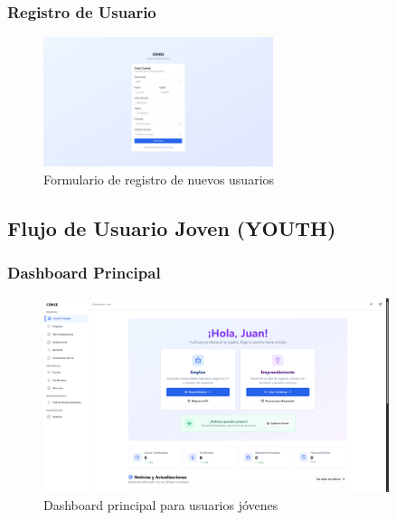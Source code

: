 \documentclass[12pt,a4paper]{article}
\begin{document}
\begin{enumerate}
\subsubsection{Registro de Usuario}
\begin{figure}[H]
    \centering
    \includegraphics[width=0.6\textwidth]{screenshots/auth/sign-up.png}
    \caption{Formulario de registro de nuevos usuarios}
    \label{fig:sign-up}
\end{figure}

\subsection{Flujo de Usuario Joven (YOUTH)}

\subsubsection{Dashboard Principal}
\begin{figure}[H]
    \centering
    \includegraphics[width=0.9\textwidth]{screenshots/youth/dashboard.png}
    \caption{Dashboard principal para usuarios jóvenes}
    \label{fig:youth-dashboard}
\end{figure}


\end{enumerate}
\end{document}
